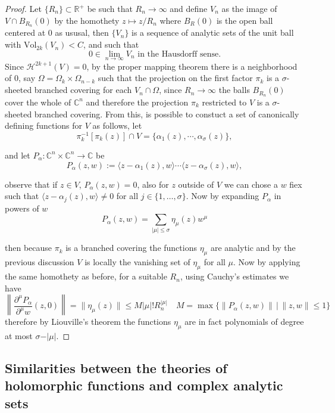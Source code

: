 \documentclass[12pt,twoside,a4paper]{report}
\newcommand{\re}{\ensuremath{\mathbb R }}
\newcommand{\co}{\ensuremath{\mathbb C }}
\newcommand{\con}{\ensuremath{\mathbb{C}^n}}
\newcommand{\om}{\ensuremath{\Omega}}
\newcommand{\hsheaf}{\ensuremath{\mathcal H }}
\begin{document}
  \begin{proof} Let $\lbrace R_n\rbrace\subset\re^{+}$ be such that $R_n\rightarrow\infty$ and define $V_n$ as the image of $V\cap B_{R_n}(0)$ by the homothety $z\longmapsto z/R_n$ where $B_R(0)$ is the open ball centered at $0$ as ususal, then $\{V_n\}$ is a sequence of analytic sets of the unit ball with $\textrm{Vol}_{2k}(V_n)<C$, and such that
    \[
      0\in\lim_{n\rightarrow\infty} V_n\text{ in the Hausdorff sense}.
    \]
    Since \(\hsheaf^{2k+1}(V)=0\), by the proper mapping theorem there is a neighborhood of $0$, say $\om=\om_k\times\om_{n-k}$ such that the projection on the first factor $\pi_k$ is a $\sigma$-sheeted branched covering for each $V_n\cap\om$, since $R_n\rightarrow\infty$ the balls $B_{R_n}(0)$ cover the whole of $\co^{n}$ and therefore the projection $\pi_k$ restricted to $V$ is a $\sigma$-sheeted branched covering. From this, is possible to constuct a set of canonically defining functions for $V$ as follows, let
  \[
  \pi_k^{-1}[\pi_k(z)]\cap V=\{\alpha_1(z),\cdots,\alpha_{\sigma}(z)\},
  \]

  \noindent and let $P_{\alpha}:\con\times\con\to\co$ be
  \begin{equation}
  P_{\alpha}(z,w):=\langle z-\alpha_1(z),w\rangle\cdots\langle z-\alpha_{\sigma}(z),w\rangle,
  \end{equation}

  \noindent observe that if $z\in V$, $P_\alpha(z,w)=0$, also for $z$ outside of $V$ we can chose a $w$ fiex such that $\langle z-\alpha_j(z),w\rangle\neq0$ for all $j\in\{1,\dots,\sigma\}$. Now by expanding $P_{\alpha}$ in powers of $w$
  \begin{equation}
  P_{\alpha}(z,w)=\sum_{\vert\mu\vert\leq\sigma} \eta_{\mu}(z)w^{\mu}
  \end{equation}

  \noindent then because $\pi_k$ is a branched covering the functions $\eta_{\mu}$ are analytic and by the previous discussion $V$ is locally the vanishing set of $\eta_{\mu}$ for all $\mu$. Now by applying the same homothety  as before, for a suitable $R_n$, using Cauchy's estimates we have
  \[
  \left\|\dfrac{\partial^{\mu} P_{\alpha}}{\partial^{\mu} w}(z,0)\right\|=\|\eta_{\mu}(z)\|\leq M|\mu|! R_n^{|\mu|}\quad M=\max\{\|P_{\alpha}(z,w)\|\,\vert\,\|z,w\|\leq 1\}
  \]
  therefore by Liouville's theorem the functions $\eta_{\mu}$ are in fact polynomials of degree at most $\sigma-\vert\mu\vert$.
  \end{proof}

  \subsection{Similarities between the theories of holomorphic functions and complex analytic sets}
\end{document}
